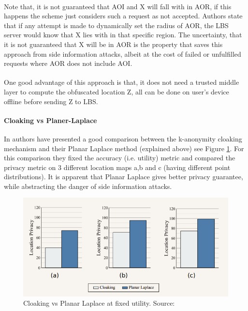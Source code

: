\documentclass[12pt]{report}
\begin{document}
\paragraph{}
Note that, it is not guaranteed that  AOI and X will fall with in AOR, if this happens the scheme just considers such a request as not accepted. Authors state that if any attempt is made to dynamically set the radius of AOR, the LBS server would know that X lies with in that specific region. The uncertainty, that it is not guaranteed that X will be in AOR is the property that saves this approach from side information attacks, albeit at the cost of failed or unfulfilled requests where AOR does not include AOI.
\paragraph{}
One good advantage of this approach is that, it does not need a trusted middle layer to compute the obfuscated location Z, all can be done on user's device offline before sending Z to LBS.
\paragraph{Cloaking vs Planer-Laplace}
In \cite{andres2013geo} authors have presented a good comparison between the k-anonymity cloaking mechanism and their Planar Laplace method (explained above) see Figure \ref{fig:CloakingVsPlanar}. For this comparison they fixed the accuracy (i.e. utility) metric and compared the privacy metric on 3 different location maps a,b and c (having different point distributions). It is apparent that Planar Laplace gives better privacy guarantee, while abstracting the danger of side information attacks.

\begin{figure}[ht]
\centering
        \includegraphics[width=120mm,scale=1]{Images/CloakingVsLaplace.PNG}
    \caption{Cloaking vs Planar Laplace at fixed utility. Source:\cite{andres2013geo}}
    \label{fig:CloakingVsPlanar}
\end{figure}
\end{document}
